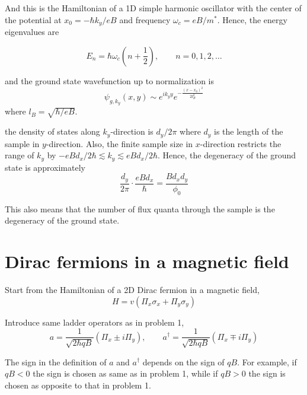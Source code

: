 \documentclass[a4paper,11pt]{article}
\begin{document}
And this is the Hamiltonian of a 1D simple harmonic oscillator with the center of the potential at $x_0 = -\hbar k_y / eB$ and frequency $\omega_c = eB / m^*$. Hence, the energy eigenvalues are

\begin{equation}
  E_n = \hbar \omega_c \left( n + \frac{1}{2} \right),\qquad n = 0, 1, 2, \ldots
\end{equation}

and the ground state wavefunction up to normalization is
\begin{equation}
  \psi_{g, k_y}(x, y) \sim e^{i k_y y} e^{-\frac{(x - x_0)^2}{2l_B^2}}
\end{equation}
where $l_B = \sqrt{\hbar / eB}$.

the density of states along $k_y$-direction is $d_y / 2\pi$ where $d_y$ is the length of the sample in $y$-direction. Also, the finite sample size in $x$-direction restricts the range of $k_y$ by $-eBd_x / 2\hbar \lesssim k_y \lesssim eBd_x / 2\hbar$. Hence, the degeneracy of the ground state is approximately
\begin{equation}
  \frac{d_y}{2\pi} \cdot \frac{eBd_x}{\hbar} = \frac{B d_x d_y}{\phi_0}
\end{equation}

This also means that the number of flux quanta through the sample is the degeneracy of the ground state.


\section{Dirac fermions in a magnetic field}



Start from the Hamiltonian of a 2D Dirac fermion in a magnetic field,
\begin{equation}
  H = v (\Pi_x\sigma_x + \Pi_y\sigma_y)
\end{equation}

Introduce same ladder operators as in problem 1,
\begin{equation}
  a = \frac{1}{\sqrt{2\hbar qB}} \left( \Pi_x \pm i\Pi_y \right),\qquad a^\dagger = \frac{1}{\sqrt{2\hbar qB}} \left( \Pi_x \mp i\Pi_y \right)
\end{equation}

The sign in the definition of $a$ and $a^\dagger$ depends on the sign of $qB$. For example, if $qB < 0$ the sign is chosen as same as in problem 1, while if $qB > 0$ the sign is chosen as opposite to that in problem 1. 
\end{document}
